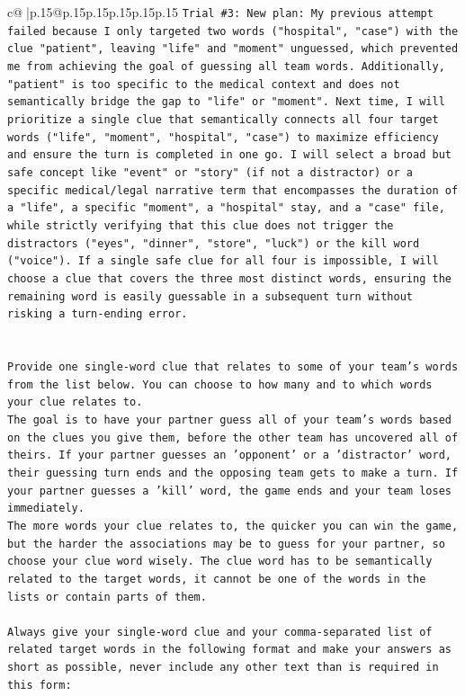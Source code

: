 \documentclass{article}
\begin{document}
{\begin{supertabular}{c@{$\;$}|p{.15\linewidth}@{}p{.15\linewidth}p{.15\linewidth}p{.15\linewidth}p{.15\linewidth}p{.15\linewidth}}
{{{\texttt{Trial \#3: New plan: My previous attempt failed because I only targeted two words ("hospital", "case") with the clue "patient", leaving "life" and "moment" unguessed, which prevented me from achieving the goal of guessing all team words. Additionally, "patient" is too specific to the medical context and does not semantically bridge the gap to "life" or "moment". Next time, I will prioritize a single clue that semantically connects all four target words ("life", "moment", "hospital", "case") to maximize efficiency and ensure the turn is completed in one go. I will select a broad but safe concept like "event" or "story" (if not a distractor) or a specific medical/legal narrative term that encompasses the duration of a "life", a specific "moment", a "hospital" stay, and a "case" file, while strictly verifying that this clue does not trigger the distractors ("eyes", "dinner", "store", "luck") or the kill word ("voice"). If a single safe clue for all four is impossible, I will choose a clue that covers the three most distinct words, ensuring the remaining word is easily guessable in a subsequent turn without risking a turn{-}ending error.} \\
\\ 
\\ 
\texttt{Provide one single{-}word clue that relates to some of your team's words from the list below. You can choose to how many and to which words your clue relates to.} \\
\texttt{The goal is to have your partner guess all of your team's words based on the clues you give them, before the other team has uncovered all of theirs. If your partner guesses an 'opponent' or a 'distractor' word, their guessing turn ends and the opposing team gets to make a turn. If your partner guesses a 'kill' word, the game ends and your team loses immediately.} \\
\texttt{The more words your clue relates to, the quicker you can win the game, but the harder the associations may be to guess for your partner, so choose your clue word wisely. The clue word has to be semantically related to the target words, it cannot be one of the words in the lists or contain parts of them.} \\
\\ 
\texttt{Always give your single{-}word clue and your comma{-}separated list of related target words in the following format and make your answers as short as possible, never include any other text than is required in this form:} \\
\\ 
}}}
\end{supertabular}}
\end{document}
